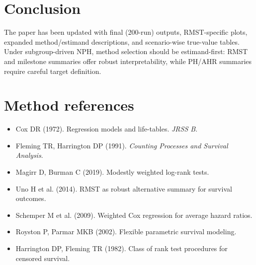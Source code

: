 \documentclass[11pt]{article}
\begin{document}
\section{Conclusion}
The paper has been updated with final (200-run) outputs, RMST-specific plots, expanded method/estimand descriptions, and scenario-wise true-value tables. Under subgroup-driven NPH, method selection should be estimand-first: RMST and milestone summaries offer robust interpretability, while PH/AHR summaries require careful target definition.

\section*{Method references}
\begin{itemize}
\item Cox DR (1972). Regression models and life-tables. \emph{JRSS B}.
\item Fleming TR, Harrington DP (1991). \emph{Counting Processes and Survival Analysis}.
\item Magirr D, Burman C (2019). Modestly weighted log-rank tests.
\item Uno H et al. (2014). RMST as robust alternative summary for survival outcomes.
\item Schemper M et al. (2009). Weighted Cox regression for average hazard ratios.
\item Royston P, Parmar MKB (2002). Flexible parametric survival modeling.
\item Harrington DP, Fleming TR (1982). Class of rank test procedures for censored survival.
\end{itemize}
\end{document}

